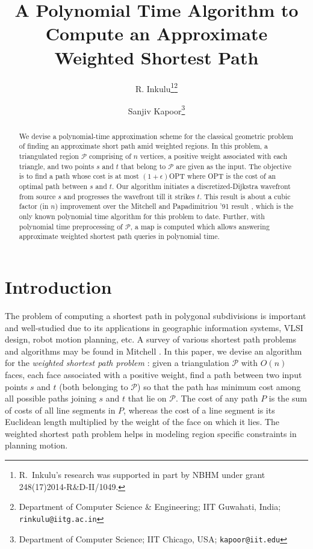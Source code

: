 \documentclass[11pt]{article}
\def\calP{\mathcal{P}}
\begin{document}
\title{A Polynomial Time Algorithm to Compute an Approximate Weighted Shortest Path}

\author{R. Inkulu\thanks{R.~Inkulu's research was supported in part by NBHM under grant 248(17)2014-R\&D-II/1049.}\footnote{
  Department of Computer Science \& Engineering; IIT Guwahati, India; \texttt{rinkulu@iitg.ac.in}
}
\and
Sanjiv Kapoor\footnote{
  Department of Computer Science; IIT Chicago, USA; \texttt{kapoor@iit.edu}
}}
\date{}
\maketitle

\begin{abstract}
We devise a polynomial-time approximation scheme for the classical geometric problem of finding an approximate short path amid weighted regions.
In this problem, a triangulated region $\calP$ comprising of $n$ vertices, a positive weight associated with each triangle, and two points $s$ and $t$ that belong to $\calP$ are given as the input.
The objective is to find a path whose cost is at most $(1+\epsilon)$OPT where OPT is the cost of an optimal path between $s$ and $t$.
Our algorithm initiates a discretized-Dijkstra wavefront from source $s$ and progresses the wavefront till it strikes $t$.
This result is about a cubic factor (in $n$) improvement over the Mitchell and Papadimitriou '91 result \cite{journals/jacm/MitchellP91}, which is the only known polynomial time algorithm for this problem to date.
Further, with polynomial time preprocessing of $\calP$, a map is computed which allows answering approximate weighted shortest path queries in polynomial time.
\end{abstract}

\section{Introduction}
\label{sect:intro}

The problem of computing a shortest path in polygonal subdivisions is important and well-studied due to its applications in geographic information systems, VLSI design, robot motion planning, etc.
A survey of various shortest path problems and algorithms may be found in Mitchell \cite{hb/cg/Mitch98}.
In this paper, we devise an algorithm for the {\it weighted shortest path problem} \cite{journals/jacm/MitchellP91}: given a triangulation $\calP$ with $O(n)$ faces, each face associated with a positive weight, find a path between two input points $s$ and $t$ (both belonging to $\calP$) so that the path has minimum cost among all possible paths joining $s$ and $t$ that lie on $\calP$. 
The cost of any path $P$ is the sum of costs of all line segments in $P$, whereas the cost of a line segment is its Euclidean length multiplied by the weight of the face on which it lies.
The weighted shortest path problem helps in modeling region specific constraints in planning motion.
\end{document}
